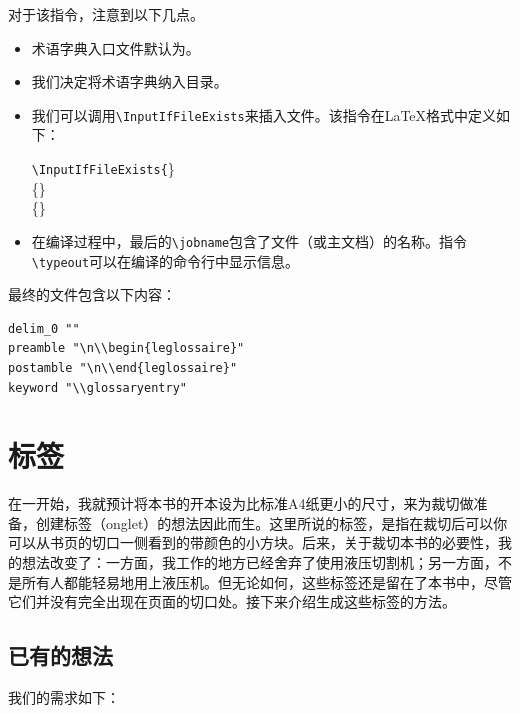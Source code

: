 对于该指令，注意到以下几点。

\begin{itemize}
    \item 术语字典入口文件默认为。
    \item 我们决定将术语字典纳入目录。
    \item 我们可以调用\verb|\InputIfFileExists|来插入文件。该指令在\LaTeX 格式中定义如下：
    
    \begin{dmd}
    \verb|\InputIfFileExists{|\}\\
    \{\}\\
    \{\}
    \end{dmd}

    \item 在编译过程中，最后的\verb|\jobname|包含了文件（或主文档）的名称。指令\verb|\typeout|可以在编译的命令行中显示信息。
\end{itemize}

最终的文件包含以下内容：

\begin{dmd}
\begin{verbatim}
delim_0 ""
preamble "\n\\begin{leglossaire}"
postamble "\n\\end{leglossaire}"
keyword "\\glossaryentry"
\end{verbatim}
\end{dmd}

\section{标签}

在一开始，我就预计将本书的开本设为比标准A4纸更小的尺寸，来为裁切做准备，创建标签（onglet）的想法因此而生。这里所说的标签，是指在裁切后可以你可以从书页的切口一侧看到的带颜色的小方块。后来，关于裁切本书的必要性，我的想法改变了：一方面，我工作的地方已经舍弃了使用液压切割机；另一方面，不是所有人都能轻易地用上液压机。但无论如何，这些标签还是留在了本书中，尽管它们并没有完全出现在页面的切口处。接下来介绍生成这些标签的方法。

\subsection{已有的想法}

我们的需求如下：

